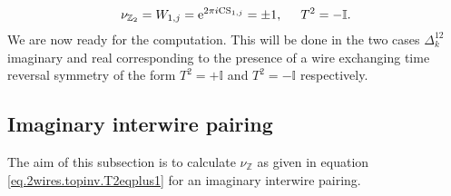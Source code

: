 \begin{equation}
\nu_{\mathbb{Z}_2} = W_{1,j} = \text{e}^{2\pi i\text{CS}_{1,j}} = \pm 1, \hspace{0.5cm} T^2 = -\mathbb{I}.
\label{eq.2wires.topinv.T2eqminus1}
\end{equation}
We are now ready for the computation. This will be done in the two cases $\Delta^{12}_k$ imaginary and real corresponding to the presence of a wire exchanging time reversal symmetry of the form $T^2 = +\mathbb{I}$ and $T^2 = -\mathbb{I}$ respectively.  

\subsection{Imaginary interwire pairing}
\label{subsec.2wires_CSinv_Delta12imag}
The aim of this subsection is to calculate $\nu_{\mathbb{Z}}$ as given in equation \eqref{eq.2wires.topinv.T2eqplus1} for an imaginary interwire pairing.

